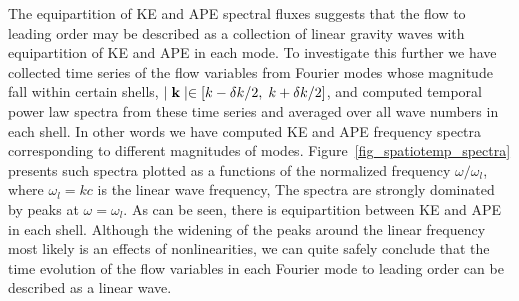 The equipartition of KE and APE spectral fluxes suggests that the flow to
leading order may be described as a collection of linear gravity waves with
equipartition of KE and APE in each mode. To investigate this further we have
collected time series of the flow variables from Fourier modes whose magnitude
fall within certain shells, $ \mid {\bf k} \mid \in [ k -\delta k/2, \; k+
\delta k/2] $, and computed temporal power law spectra from these time series
and averaged over all wave numbers in each shell. In other words we have
computed KE and APE frequency spectra corresponding to different magnitudes of
modes. Figure~\ref{fig_spatiotemp_spectra} presents such spectra plotted as a
functions of the normalized frequency $\omega/\omega_l$, where $ \omega_l = kc
$ is the linear wave frequency, The spectra are strongly dominated by peaks at
$\omega = \omega_l$. As can be seen, there is equipartition between KE and APE
in each shell. Although the widening of the peaks around the linear frequency
most likely is an effects of nonlinearities, we can quite safely conclude that
the time evolution of the flow variables in each Fourier mode to leading order
can be described as a linear wave.

